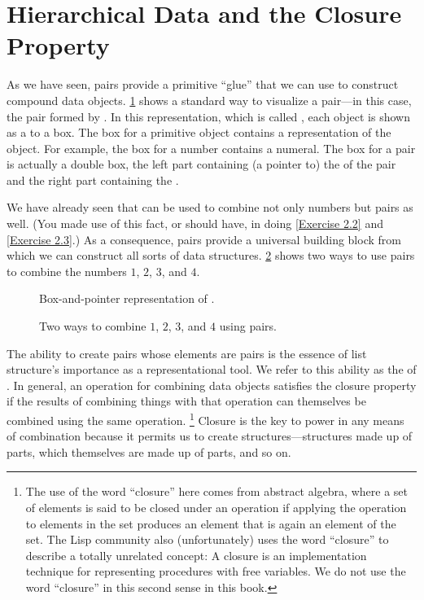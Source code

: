 \section{Hierarchical Data and the Closure Property}
\label{Section 2.2}

As we have seen, pairs provide a primitive “glue” that we can use to construct compound data objects.
\cref{Figure 2.2} shows a standard way to visualize a pair---in this case, the pair formed by .
In this representation, which is called , each object is shown as a  to a box.
The box for a primitive object contains a representation of the object.
For example, the box for a number contains a numeral.
The box for a pair is actually a double box, the left part containing (a pointer to) the  of the pair and the right part containing the .

We have already seen that  can be used to combine not only numbers but pairs as well.
(You made use of this fact, or should have, in doing \cref{Exercise 2.2} and \cref{Exercise 2.3}.)
As a consequence, pairs provide a universal building block from which we can construct all sorts of data structures.
\cref{Figure 2.3} shows two ways to use pairs to combine the numbers \( 1 \), \( 2 \), \( 3 \), and \( 4 \).

\begin{figure}[tb]
	\centering
	
	\caption{
		Box-and-pointer representation of .
	}
	\label{Figure 2.2}
\end{figure}

\begin{figure}[tb]
	\centering
	
	\caption{
		Two ways to combine \( 1 \), \( 2 \), \( 3 \), and \( 4 \) using pairs.
	}
	\label{Figure 2.3}
\end{figure}

The ability to create pairs whose elements are pairs is the essence of list structure’s importance as a representational tool.
We refer to this ability as the  of .
In general, an operation for combining data objects satisfies the closure property if the results of combining things with that operation can themselves be combined using the same operation.%
\footnote{
	The use of the word “closure” here comes from abstract algebra, where a set of elements is said to be closed under an operation if applying the operation to elements in the set produces an element that is again an element of the set.
	The Lisp community also (unfortunately) uses the word “closure” to describe a totally unrelated concept:
	A closure is an implementation technique for representing procedures with free variables.
	We do not use the word “closure” in this second sense in this book.
}
Closure is the key to power in any means of combination because it permits us to create  structures---structures made up of parts, which themselves are made up of parts, and so on.

